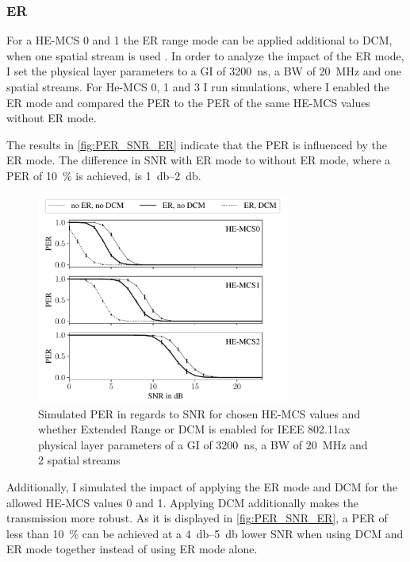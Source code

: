 \subsubsection*{\acf{ER}}
For a HE-MCS \num{0} and \num{1} the \ac{ER} range mode can be applied additional to \ac{DCM}, when one spatial stream is used \cite{ieee_standard_2021ax}.
In order to analyze the impact of the \ac{ER} mode, I set the physical layer parameters to a \ac{GI} of
\SI{3200}{\nano\second}, a \ac{BW} of \SI{20}{\mega\hertz} and one spatial streams.
For He-MCS \num{0}, \num{1} and \num{3} I run simulations, where I enabled the
\ac{ER} mode and compared the \ac{PER} to the \ac{PER} of the same HE-MCS values without \ac{ER} mode.

The results in \autoref{fig:PER_SNR_ER} indicate that the \ac{PER} is influenced by the \ac{ER} mode.
The difference in \ac{SNR} with \ac{ER} mode to without \ac{ER} mode, where a \ac{PER}
of \SI{10}{\percent} is achieved, is \SIrange{1}{2}{\decibel}.

\begin{figure}%
   \centering
   \includegraphics[width=0.74\textwidth]{figures/ER_PER_to_SNR.pdf}
   \caption{Simulated \ac{PER} in regards to \ac{SNR} for chosen HE-\ac{MCS} values and whether Extended Range or \ac{DCM}
   is enabled for IEEE 802.11ax physical layer parameters of a \ac{GI} of \SI{3200}{\nano\second}, a \ac{BW} of \SI{20}{\mega\hertz} and 2 spatial streams}
   \label{fig:PER_SNR_ER}%
\end{figure}

Additionally, I simulated the impact of applying the \ac{ER} mode and \ac{DCM} for the allowed HE-MCS values \num{0} and \num{1}.
Applying \ac{DCM} additionally makes the transmission more robust.
As it is displayed in \autoref{fig:PER_SNR_ER},
a \ac{PER} of less than \SI{10}{\percent} can be achieved at a \SIrange{4}{5}{\decibel} lower \ac{SNR} when using \ac{DCM} and \ac{ER} mode together instead
of using \ac{ER} mode alone.

